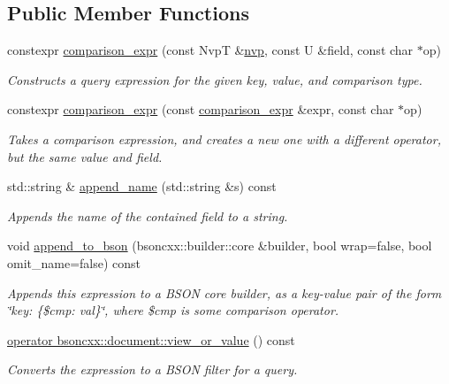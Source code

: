 \subsection*{Public Member Functions}
\begin{DoxyCompactItemize}
\item 
constexpr \hyperlink{classmongo__odm_1_1comparison__expr_a8cb08d386b0b1cbb88780d12c29c385e}{comparison\+\_\+expr} (const NvpT \&\hyperlink{classmongo__odm_1_1nvp}{nvp}, const U \&field, const char $\ast$op)
\begin{DoxyCompactList}\small\item\em Constructs a query expression for the given key, value, and comparison type. \end{DoxyCompactList}\item 
constexpr \hyperlink{classmongo__odm_1_1comparison__expr_aa60e06beaf4e99b7b73a445b4fc5ffe7}{comparison\+\_\+expr} (const \hyperlink{classmongo__odm_1_1comparison__expr}{comparison\+\_\+expr} \&expr, const char $\ast$op)
\begin{DoxyCompactList}\small\item\em Takes a comparison expression, and creates a new one with a different operator, but the same value and field. \end{DoxyCompactList}\item 
std\+::string \& \hyperlink{classmongo__odm_1_1comparison__expr_a3adf1fd565c8a6c1bb01ca9d4ee42ce5}{append\+\_\+name} (std\+::string \&s) const \hypertarget{classmongo__odm_1_1comparison__expr_a3adf1fd565c8a6c1bb01ca9d4ee42ce5}{}\label{classmongo__odm_1_1comparison__expr_a3adf1fd565c8a6c1bb01ca9d4ee42ce5}

\begin{DoxyCompactList}\small\item\em Appends the name of the contained field to a string. \end{DoxyCompactList}\item 
void \hyperlink{classmongo__odm_1_1comparison__expr_a2ed6e4e5fd013703369938911b4c367e}{append\+\_\+to\+\_\+bson} (bsoncxx\+::builder\+::core \&builder, bool wrap=false, bool omit\+\_\+name=false) const 
\begin{DoxyCompactList}\small\item\em Appends this expression to a B\+S\+ON core builder, as a key-\/value pair of the form \char`\"{}key\+: \{\$cmp\+: val\}\char`\"{}, where \$cmp is some comparison operator. \end{DoxyCompactList}\item 
\hyperlink{classmongo__odm_1_1comparison__expr_a5c3c4afa7894a5268e6c9ab76c4d83e3}{operator bsoncxx\+::document\+::view\+\_\+or\+\_\+value} () const 
\begin{DoxyCompactList}\small\item\em Converts the expression to a B\+S\+ON filter for a query. \end{DoxyCompactList}\end{DoxyCompactItemize}



